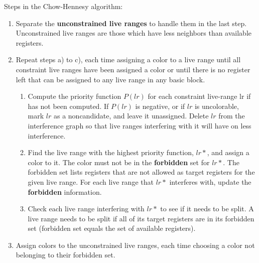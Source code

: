 \documentclass[a4paper,10pt]{article}
\begin{document}
Steps in the Chow-Hennesy algorithm:
\begin{enumerate}
	\item Separate the \textbf{unconstrained live ranges} to handle them in the last step. Unconstrained live ranges are those which have less neighbors than available registers.
	\item Repeat steps a) to c), each time assigning a color to a live range until all constraint live ranges have been assigned a color or until there is no register left that can be assigned to any live range in any basic block.
 \begin{enumerate}
	\item Compute the priority function $P(lr)$ for each constraint live-range lr if has not been computed. If $P(lr)$ is negative, or if $lr$ is uncolorable, mark $lr$ as a noncandidate, and leave it unassigned. Delete $lr$ from the interference graph so that live ranges interfering with it will have on less interference.
	\item Find the live range with the highest priority function, $lr*$, and assign a color to it. The color must not be in the \textbf{forbidden} set for $lr*$. The forbidden set lists registers that are not allowed as target registers for the given live range. For each live range that $lr*$ interferes with, update the \textbf{forbidden} information.
	\item Check each live range interfering with $lr*$ to see if it needs to be split. A live range needs to be split if all of its target registers are in its forbidden set (forbidden set equals the set of available registers).
 \end{enumerate}
	\item Assign colors to the unconstrained live ranges, each time choosing a color not belonging to their forbidden set.
\end{enumerate}
\end{document}
